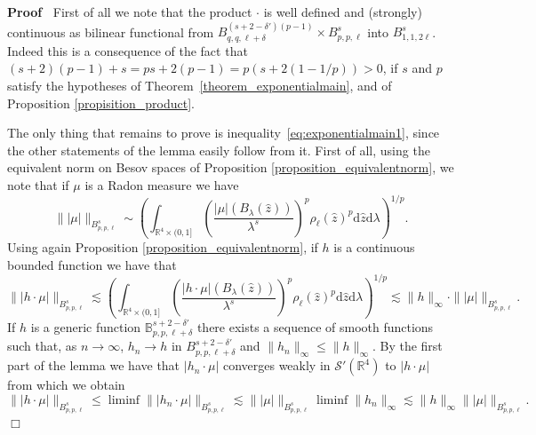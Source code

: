 \documentclass[a4paper,10pt]{article}
\newcommand{\mathd}{\mathrm{d}}
\newenvironment{proof}{\noindent\textbf{Proof\ }}{\hspace*{\fill}$\Box$\medskip}
\begin{document}
\begin{proof}
  First of all we note that the product $\cdot$ is well defined and (strongly)
  continuous as bilinear functional from $B^{(s + 2 - \delta') (p - 1)}_{q, q,
  \ell + \delta} \times B^s_{p, p, \ell}$ into $B^s_{1, 1, 2 \ell}$. Indeed
  this is a consequence of the fact that $(s + 2) (p - 1) + s = p s + 2 (p -
  1) = p (s + 2 (1 - 1 / p)) > 0$, if $s$ and $p$ satisfy the hypotheses of
  Theorem~\ref{theorem_exponentialmain}, and of Proposition
  \ref{propisition_product}.
  
  The only thing that remains to prove is
  inequality~{\eqref{eq:exponentialmain1}}, since the other statements of the
  lemma easily follow from it. First of all, using the equivalent norm on
  Besov spaces of Proposition \ref{proposition_equivalentnorm}, we note that
  if $\mu$ is a Radon measure we have
  \[ \| | \mu | \|_{B^s_{p, p, \ell}} \sim \left( \int_{\mathbb{R}^4 \times
     (0, 1]} \left( \frac{| \mu | (B_{\lambda} (\hat{z}))}{\lambda^s}
     \right)^p \rho_{\ell} (\hat{z})^p \mathd \hat{z} \mathd \lambda
     \right)^{1 / p} . \]
  Using again Proposition \ref{proposition_equivalentnorm}, if $h$ is a
  continuous bounded function we have that
  \[ \| | h \cdot \mu | \|_{B^s_{p, p, \ell}} \lesssim \left(
     \int_{\mathbb{R}^4 \times (0, 1]} \left( \frac{| h \cdot \mu |
     (B_{\lambda} (\hat{z}))}{\lambda^s} \right)^p \rho_{\ell} (\hat{z})^p
     \mathd \hat{z} \mathd \lambda \right)^{1 / p} \lesssim \| h \|_{\infty}
     \cdot \| | \mu | \|_{B^s_{p, p, \ell}} . \]
  If $h$ is a generic function $\mathbb{B}^{s + 2 - \delta'}_{p, p, \ell +
  \delta}$ there exists a sequence of smooth functions such that, as $n
  \rightarrow \infty$, $h_n \rightarrow h$ in $B^{s + 2 - \delta'}_{p, p, \ell
  + \delta}$ and $\| h_n \|_{\infty} \leqslant \| h \|_{\infty}$. By the first
  part of the lemma we have that $| h_n \cdot \mu |$ converges weakly in
  $\mathcal{S}' (\mathbb{R}^4)$ to $| h \cdot \mu |$ from which we obtain
  \[ \| | h \cdot \mu | \|_{B^s_{p, p, \ell}} \leqslant \liminf \| | h_n \cdot
     \mu | \|_{B^s_{p, p, \ell}} \lesssim \| | \mu | \|_{B^s_{p, p, \ell}}
     \liminf \| h_n \|_{\infty} \lesssim \| h \|_{\infty} \| | \mu |
     \|_{B^s_{p, p, \ell}} . \]
\end{proof}
\end{document}
